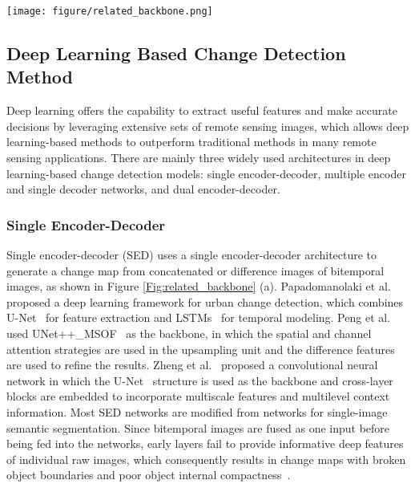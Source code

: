 \documentclass[journal]{IEEEtran}
\begin{document}
\begin{figure*}[!ht]
	\centering
		\texttt{[image: figure/related\_backbone.png]}
	\caption{Illustration of the architecture of SED, MESD and DED. T1 and T2 denote bitemporal images, F denotes a fusion module. (a) SED: Single encoder-decoder architecture. (b) MESD: Multiple encoders and single decoder architecture. (c) DED: Dual encoder-decoder architecture.}
 \label{Fig:related_backbone}
\end{figure*}

\subsection{Deep Learning Based Change Detection Method}
Deep learning offers the capability to extract useful features and make accurate decisions by leveraging extensive sets of remote sensing images, which allows deep learning-based methods to outperform traditional methods in many remote sensing applications. There are mainly three widely used architectures in deep learning-based change detection models: single encoder-decoder, multiple encoder and single decoder networks, and dual encoder-decoder.

\subsubsection{Single Encoder-Decoder}
Single encoder-decoder (SED) uses a single encoder-decoder architecture to generate a change map from concatenated or difference images of bitemporal images, as shown in Figure \ref{Fig:related_backbone} (a). Papadomanolaki et al.~\cite{duc} proposed a deep learning framework for urban change detection, which combines U-Net~\cite{unet} for feature extraction and LSTMs~\cite{lstm} for temporal modeling.  Peng et al.~\cite{orsi} used UNet++\_MSOF~\cite{etecd} as the backbone, in which the spatial and channel attention strategies are used in the upsampling unit and the difference features are used to refine the results. Zheng et al.~\cite{clnet} proposed a convolutional neural network in which the U-Net~\cite{unet} structure is used as the backbone and cross-layer blocks are embedded to incorporate multiscale features and multilevel context information. Most SED networks are modified from networks for single-image semantic segmentation. Since bitemporal images are fused as one input before being fed into the networks, early layers fail to provide informative deep features of individual raw images, which consequently results in change maps with broken object boundaries and poor object internal compactness~\cite{dsifn}.
\end{document}
